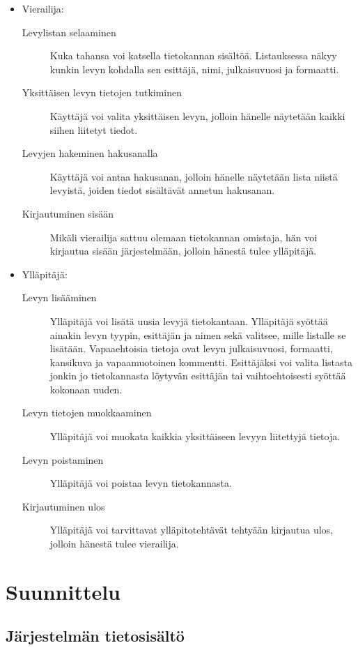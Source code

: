 \documentclass[a4paper,12pt]{report}
\begin{document}
\begin{itemize}

\item Vierailija:
\begin{description}
\item[Levylistan selaaminen] Kuka tahansa voi katsella tietokannan sisältöä.
Listauksessa näkyy kunkin levyn kohdalla sen esittäjä, nimi, julkaisuvuosi ja
formaatti.
\item[Yksittäisen levyn tietojen tutkiminen] Käyttäjä voi valita yksittäisen
levyn, jolloin hänelle näytetään kaikki siihen liitetyt tiedot.
\item[Levyjen hakeminen hakusanalla] Käyttäjä voi antaa hakusanan, jolloin
hänelle näytetään lista niistä levyistä, joiden tiedot sisältävät annetun
hakusanan.
\item[Kirjautuminen sisään] Mikäli vierailija sattuu olemaan tietokannan
omistaja, hän voi kirjautua sisään järjestelmään, jolloin hänestä tulee
ylläpitäjä.
\end{description}

\item Ylläpitäjä:
\begin{description}
\item[Levyn lisääminen] Ylläpitäjä voi lisätä uusia levyjä tietokantaan.
Ylläpitäjä syöttää ainakin levyn tyypin, esittäjän ja nimen sekä valitsee, mille
listalle se lisätään. Vapaaehtoisia tietoja ovat levyn julkaisuvuosi, formaatti,
kansikuva ja vapaamuotoinen kommentti. Esittäjäksi voi valita listasta jonkin jo
tietokannasta löytyvän esittäjän tai vaihtoehtoisesti syöttää kokonaan uuden.
\item[Levyn tietojen muokkaaminen] Ylläpitäjä voi muokata kaikkia yksittäiseen
levyyn liitettyjä tietoja.
\item[Levyn poistaminen] Ylläpitäjä voi poistaa levyn tietokannasta.
\item[Kirjautuminen ulos] Ylläpitäjä voi tarvittavat ylläpitotehtävät tehtyään
kirjautua ulos, jolloin hänestä tulee vierailija.
\end{description}

\end{itemize}

\chapter{Suunnittelu}

\section{Järjestelmän tietosisältö}
\end{document}
